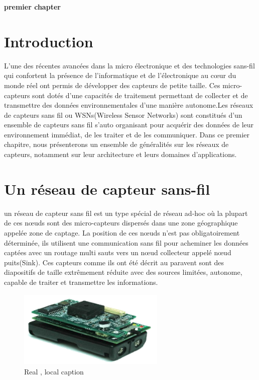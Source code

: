 

\cleardoublepage


\setcounter{chapter}{1}



\begin{center}
	\Huge\textbf{premier chapter}	
\end{center}

\section{Introduction}
L’une des récentes avancées dans la micro électronique et des technologies sans-fil qui confortent la présence de l’informatique et de l’électronique au cœur du monde réel ont permis de développer des capteurs de petite taille. Ces  micro-capteurs sont dotés d’une capacités de traitement permettant de collecter et de transmettre des données environnementales d'une manière autonome.Les réseaux de capteurs sans fil ou WSNs(Wireless Sensor Networks) sont constitués d’un ensemble de capteurs sans fil s’auto organisant pour acquérir des données de leur environnement immédiat, de les traiter et de les communiquer.
Dans ce premier chapitre, nous présenterons un ensemble de généralités sur les réseaux de capteurs, notamment sur leur architecture et leurs domaines d’applications.\\

\section{Un réseau de capteur sans-fil}
un réseau de capteur sans fil est un type spécial de réseau ad-hoc où la plupart de ces nœuds sont des micro-capteurs dispersés dans une zone géographique appelée zone de captage. La position de ces nœuds n’est pas obligatoirement déterminée, ils utilisent une communication sans fil pour acheminer les données captées avec un routage multi sauts vers un nœud collecteur appelé nœud puits(Sink). Ces capteurs comme ils ont été décrit au paravent  sont des diapositifs de taille extrêmement réduite avec des sources limitées, autonome, capable de traiter et transmettre les informations.

\begin{figure}[h]
	\centering
	\includegraphics[width=7cm,height=3.7cm]{Chap1/chap1.png}
	\caption[Optinal caption]{Real , local caption}
	\label{fig:tobias}
\end{figure}

